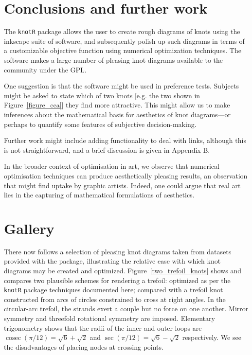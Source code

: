 \documentclass{birkjour}
\theoremstyle{definition}
\theoremstyle{remark}
\numberwithin{equation}{section}
\begin{document}
\section{Conclusions and further work}

The {\tt knotR} package allows the user to create rough diagrams of
knots using the inkscape suite of software, and subsequently polish up
such diagrams in terms of a customizable objective function using
numerical optimization techniques.  The software makes a large number
of pleasing knot diagrams available to the community under the GPL.

One suggestion is that the software might be used in preference tests.
Subjects might be asked to state which of two knots [e.g. the two
  shown in Figure~\ref{figure_cca}] they find more attractive.  This
might allow us to make inferences about the mathematical basis for
aesthetics of knot diagrams---or perhaps to quantify some features of
subjective decision-making.

Further work might include adding functionality to deal with links,
although this is not straightforward, and a brief discussion is given
in Appendix B.

In the broader context of optimisation in art, we observe that
numerical optimisation techniques can produce aesthetically pleasing
results, an observation that might find uptake by graphic artists.
Indeed, one could argue that real art lies in the capturing of
mathematical formulations of aesthetics.

\clearpage
\section{Gallery}

There now follows a selection of pleasing knot diagrams taken from
datasets provided with the package, illustrating the relative ease
with which knot diagrams may be created and optimized.
Figure~\ref{two_trefoil_knots} shows and compares two plausible
schemes for rendering a trefoil: optimized as per the {\tt knotR}
package techniques documented here; compared with a trefoil knot
constructed from arcs of circles constrained to cross at right angles.
In the circular-arc trefoil, the strands exert a couple but no force
on one another.  Mirror symmetry and threefold rotational symmetry are
imposed.  Elementary trigonometry shows that the radii of the inner
and outer loops are $\operatorname{cosec}(\pi/12)=\sqrt{6}+\sqrt{2}$
and $\sec(\pi/12)=\sqrt{6}-\sqrt{2}$ respectively.  We see the
disadvantages of placing nodes at crossing points.
\end{document}
